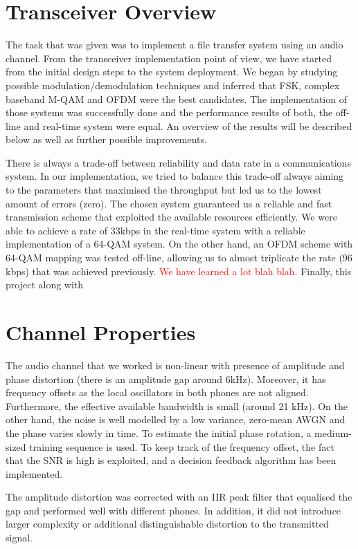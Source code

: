 \documentclass[12pt,a4paper,openright]{report}
\begin{document}
\section{Transceiver Overview}

The task that was given was to implement a file transfer system using an audio channel. From the transceiver implementation point of view, we have started from the initial design steps to the system deployment. We began by studying possible modulation/demodulation techniques and inferred that FSK, complex baseband M-QAM and OFDM were the best candidates.  The implementation of those systems was successfully done and the performance results of both, the off-line and real-time system were equal. An overview of the results will be described below as well as further possible improvements. 

There is always a trade-off between reliability and data rate in a communications system. In our implementation, we tried to balance this trade-off always aiming to the parameters that maximised the throughput but led us to the lowest amount of errors (zero). The chosen system guaranteed us a reliable and fast transmission scheme that exploited the available resources efficiently. We were able to achieve a rate of 33kbps in the real-time system with a reliable implementation of a 64-QAM system. On the other hand, an OFDM scheme with 64-QAM mapping was tested off-line, allowing us to almost triplicate the rate (96 kbps) that was achieved previously. 
\textcolor{red}{We have learned a lot blah blah.} Finally, this project along with 

\section{Channel Properties}
The audio channel that we worked is non-linear with presence of amplitude and phase distortion (there is an amplitude gap around 6kHz). Moreover, it has frequency offsets as the local oscillators in both phones are not aligned. Furthermore, the effective available bandwidth is small (around 21 kHz). On the other hand, the noise is well modelled by a low variance, zero-mean AWGN and the phase varies slowly in time. To estimate the initial phase rotation, a medium-sized training sequence is used. To keep track of the frequency offset, the fact that the SNR is high is exploited, and a decision feedback algorithm has been implemented.

The amplitude distortion was corrected with an IIR peak filter that equalised the gap and performed well with different phones. In addition, it did not introduce larger complexity or additional distinguishable distortion to the transmitted signal.
\end{document}
